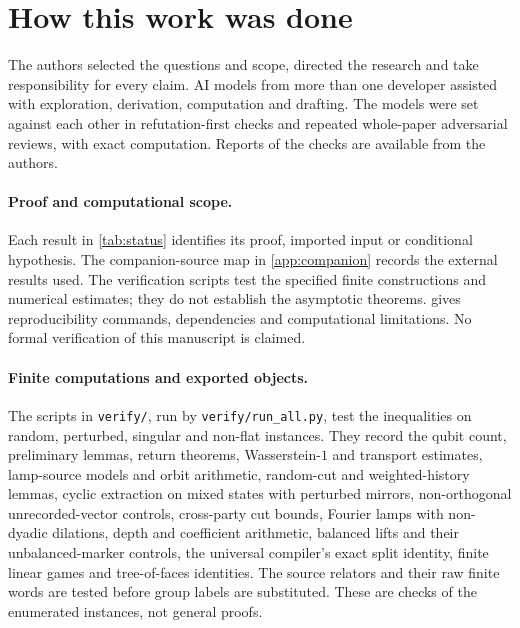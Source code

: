 \section*{How this work was done}\label{sec:methods}

The authors selected the questions and scope, directed the research and take responsibility for every claim. AI models from more than one developer assisted with exploration, derivation, computation and drafting. The models were set against each other in refutation-first checks and repeated whole-paper adversarial reviews, with exact computation. Reports of the checks are available from the authors.

\paragraph{Proof and computational scope.} Each result in \cref{tab:status} identifies its proof, imported input or conditional hypothesis. The companion-source map in \cref{app:companion} records the external results used. The verification scripts test the specified finite constructions and numerical estimates; they do not establish the asymptotic theorems.  gives reproducibility commands, dependencies and computational limitations. No formal verification of this manuscript is claimed.

\paragraph{Finite computations and exported objects.}
The scripts in \texttt{verify/}, run by \texttt{verify/run\_all.py}, test the inequalities on random, perturbed, singular and non-flat instances. They record the qubit count, preliminary lemmas, return theorems, Wasserstein-$1$ and transport estimates, lamp-source models and orbit arithmetic, random-cut and weighted-history lemmas, cyclic extraction on mixed states with perturbed mirrors, non-orthogonal unrecorded-vector controls, cross-party cut bounds, Fourier lamps with non-dyadic dilations, depth and coefficient arithmetic, balanced lifts and their unbalanced-marker controls, the universal compiler's exact split identity, finite linear games and tree-of-faces identities. The source relators and their raw finite words are tested before group labels are substituted. These are checks of the enumerated instances, not general proofs.

